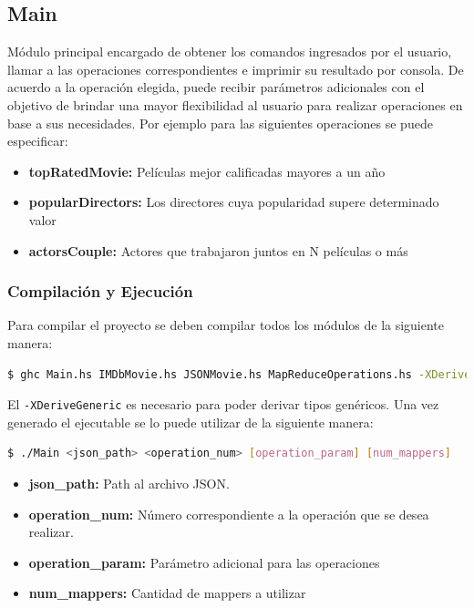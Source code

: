 \documentclass[a4paper,11pt]{article}
\begin{document}
\subsection{Main}

Módulo principal encargado de obtener los comandos ingresados por el usuario, llamar a las operaciones correspondientes e imprimir su resultado por consola. De acuerdo a la operación elegida, puede recibir parámetros adicionales con el objetivo de brindar una mayor flexibilidad al usuario para realizar operaciones en base a sus necesidades. Por ejemplo para las siguientes operaciones se puede especificar:

\begin{itemize}
	\item \textbf{topRatedMovie:} Películas mejor calificadas mayores a un año
	\item \textbf{popularDirectors:} Los directores cuya popularidad supere determinado valor
	\item \textbf{actorsCouple:} Actores que trabajaron juntos en N películas o más
\end{itemize}

\subsubsection{Compilación y Ejecución}
Para compilar el proyecto se deben compilar todos los módulos de la siguiente manera:
	\begin{lstlisting}[language=bash]
  $ ghc Main.hs IMDbMovie.hs JSONMovie.hs MapReduceOperations.hs -XDeriveGeneric
	\end{lstlisting}
  
El \texttt{-XDeriveGeneric} es necesario para poder derivar tipos genéricos. Una vez generado el ejecutable se lo puede utilizar de la siguiente manera:


  	\begin{lstlisting}[language=bash]
  $ ./Main <json_path> <operation_num> [operation_param] [num_mappers]
    \end{lstlisting}
    
\begin{itemize}
	\item \textbf{json\_path:} Path al archivo JSON.
	\item \textbf{operation\_num:} Número correspondiente a la operación que se desea realizar.
	\item \textbf{operation\_param:} Parámetro adicional para las operaciones
	\item \textbf{num\_mappers:} Cantidad de mappers a utilizar
\end{itemize}
  
\end{document}
